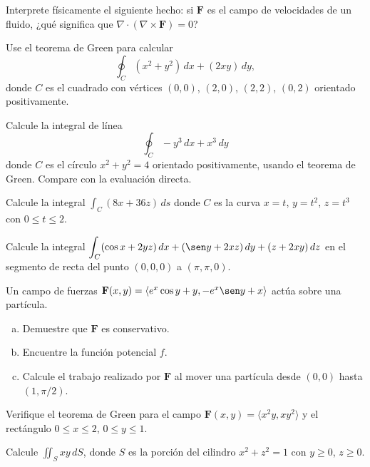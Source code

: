 \begin{prob}
Interprete físicamente el siguiente hecho: si $\mathbf{F}$ es el campo
de velocidades de un fluido, ¿qué significa que
$\nabla \cdot (\nabla \times \mathbf{F})=0$?
\end{prob}

\begin{prob}
Use el teorema de Green para calcular
\[
\oint_C (x^2 + y^2)\,dx + (2xy)\,dy,
\]
donde $C$ es el cuadrado con vértices $(0,0)$, $(2,0)$, $(2,2)$,
$(0,2)$ orientado positivamente.
\end{prob}

\begin{prob}
Calcule la integral de línea
\[
\oint_C -y^3\,dx + x^3\,dy
\]
donde $C$ es el círculo $x^2+y^2=4$ orientado positivamente, usando
el teorema de Green. Compare con la evaluación directa.
\end{prob}

\begin{prob}
Calcule la integral $\displaystyle\int_{C}(8x+36z)\,ds$ donde $C$ es la curva $x=t$, $y=t^2$, $z=t^3$ con $0\leq t\leq 2$.
\end{prob}

\begin{prob}
Calcule la integral $\displaystyle\int_{C}(\cos x+2yz)\,dx+(\sen y+2xz)\,dy+(z+2xy)\,dz$ en el segmento de recta del punto $(0,0,0)$ a $(\pi,\pi,0)$.
\end{prob}

\begin{prob}
Un campo de fuerzas $\mathbf{F}(x,y) = \langle e^x \cos y + y,
-e^x \sen y + x \rangle$ actúa sobre una partícula.
\begin{enumerate}[(a)]
    \item Demuestre que $\mathbf{F}$ es conservativo.
    \item Encuentre la función potencial $f$.
    \item Calcule el trabajo realizado por $\mathbf{F}$ al mover una
    partícula desde $(0,0)$ hasta $(1,\pi/2)$.
\end{enumerate}
\end{prob}

\begin{prob}
Verifique el teorema de Green para el campo $\mathbf{F}(x,y) =
\langle x^2 y, x y^2 \rangle$ y el rectángulo $0\le x\le 2$,
$0\le y\le 1$.
\end{prob}

\begin{prob}
Calcule $\displaystyle \iint_S xy\,dS$, donde $S$ es la porción del cilindro $x^2+z^2=1$ con $y\ge 0$, $z\ge 0$.
\end{prob}

